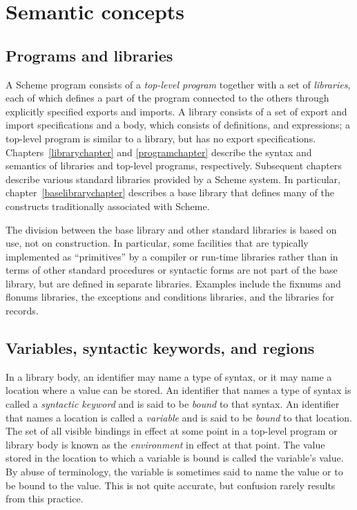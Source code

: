 \chapter{Semantic concepts}
\label{basicchapter}

\section{Programs and libraries}

A Scheme program consists of a \textit{top-level program}
together with a set of \textit{libraries}, each
of which defines a part of the program connected to the others through
explicitly specified exports and imports.  A library consists of a set
of export and import specifications and a body, which consists of
definitions, and expressions;
a top-level program is similar to a library, but
has no export specifications.
Chapters~\ref{librarychapter} and \ref{programchapter}
describe the syntax and semantics of libraries and top-level programs,
respectively.  Subsequent chapters
describe various standard libraries provided by a Scheme system.  In
particular, chapter~\ref{baselibrarychapter} describes a base
library that defines many of the constructs traditionally associated with
Scheme.

The division between the base library and other standard libraries is
based on use, not on construction.  In particular, some facilities
that are typically implemented as ``primitives'' by a compiler or
run-time libraries rather than in terms of other standard procedures
 or syntactic forms are not part of the base library, but are defined in
separate libraries.  Examples include the fixnums and flonums libraries,
the exceptions and conditions libraries, and the libraries for
records.

\section{Variables, syntactic keywords, and regions}
\label{specialformsection}
\label{variablesection}

In a library body,
an identifier may name a type of syntax, or it may name
a location where a value can be stored.  An identifier that names a type
of syntax is called a {\em syntactic keyword}
and is said to be {\em bound} to that syntax.  An identifier that names a
location is called a {\em variable} and is said to be
{\em bound} to that location.  The set of all visible
bindings in effect at some point in a top-level program or
library body is
known as the {\em environment} in effect at that point.  The value
stored in the location to which a variable is bound is called the
variable's value.  By abuse of terminology, the variable is sometimes
said to name the value or to be bound to the value.  This is not quite
accurate, but confusion rarely results from this practice.

